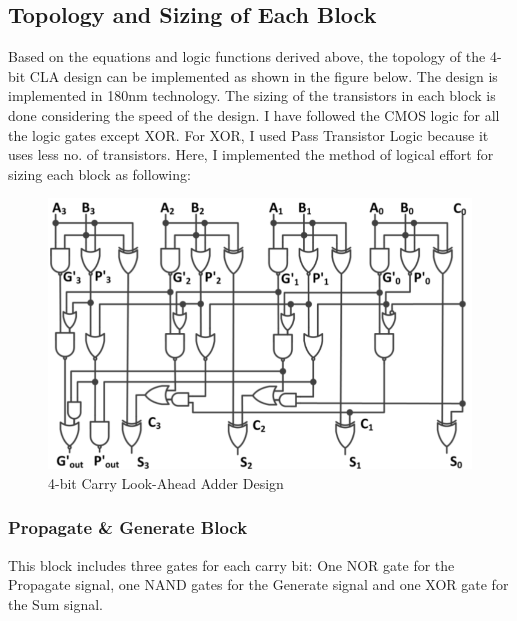 \documentclass[conference]{IEEEtran}
\begin{document}

\subsection{Topology and Sizing of Each Block}
\noindent
Based on the equations and logic functions derived above, the topology of the 4-bit CLA design can be implemented as shown in the figure below. The design is implemented in 180nm technology. The sizing of the transistors in each block is done considering the speed of the design. I have followed the CMOS logic for all the logic gates except XOR. For XOR, I used Pass Transistor Logic because it uses less no. of transistors. Here, I implemented the method of logical effort for sizing each block as following:

\begin{figure}[H]
    \centering
    \includegraphics[width=1\linewidth]{Circuit_Diagram.png}
    \caption{4-bit Carry Look-Ahead Adder Design}
    \label{fig:cla}
    \end{figure}

\subsubsection{Propagate \& Generate Block}
This block includes three gates for each carry bit: One NOR gate for the Propagate signal, one NAND gates for the Generate signal and one XOR gate for the Sum signal.
\end{document}

